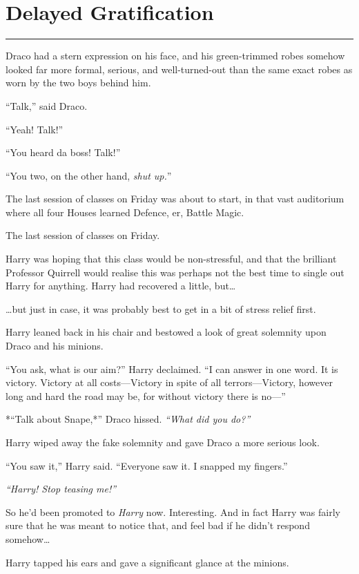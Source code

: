 \chapter{Delayed Gratification}

\begin{center}\rule{3in}{0.4pt}\end{center}

Draco had a stern expression on his face, and his green-trimmed robes
somehow looked far more formal, serious, and well-turned-out than the
same exact robes as worn by the two boys behind him.

``Talk,'' said Draco.

``Yeah! Talk!''

``You heard da boss! Talk!''

``You two, on the other hand, \emph{shut up.}''

The last session of classes on Friday was about to start, in that vast
auditorium where all four Houses learned Defence, er, Battle Magic.

The last session of classes on Friday.

Harry was hoping that this class would be non-stressful, and that the
brilliant Professor Quirrell would realise this was perhaps not the best
time to single out Harry for anything. Harry had recovered a little,
but\ldots{}

\ldots{}but just in case, it was probably best to get in a bit of stress
relief first.

Harry leaned back in his chair and bestowed a look of great solemnity
upon Draco and his minions.

``You ask, what is our aim?'' Harry declaimed. ``I can answer in one
word. It is victory. Victory at all costs---Victory in spite of all
terrors---Victory, however long and hard the road may be, for without
victory there is no---''

*``Talk about Snape,*'' Draco hissed. \emph{``What did you do?''}

Harry wiped away the fake solemnity and gave Draco a more serious look.

``You saw it,'' Harry said. ``Everyone saw it. I snapped my fingers.''

\emph{``Harry! Stop teasing me!''}

So he'd been promoted to \emph{Harry} now. Interesting. And in fact
Harry was fairly sure that he was meant to notice that, and feel bad if
he didn't respond somehow\ldots{}

Harry tapped his ears and gave a significant glance at the minions.

